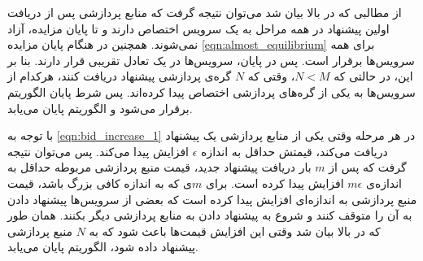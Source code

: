       از مطالبی که در بالا بیان شد می‌توان نتیجه گرفت که منابع پردازشی پس از دریافت اولین پیشنهاد در همه مراحل به یک سرویس اختصاص دارند و تا پایان مزایده، آزاد نمی‌شوند.
      همچنین در هنگام پایان مزایده \cref{eqn:almost_equilibrium} برای همه سرویس‌ها برقرار است.
      پس در پایان، سرویس‌ها در یک تعادل تقریبی قرار دارند.
      بنا بر این، در حالتی که $N<M$، وقتی که $N$ گره‌ی پردازشی پیشنهاد دریافت کنند، هرکدام از سرویس‌ها به یکی از گره‌های پردازشی اختصاص پیدا کرده‌اند.
      پس شرط پایان الگوریتم برقرار می‌شود و الگوریتم پایان می‌یابد.

      با توجه به \cref{eqn:bid_increase_1} در هر مرحله وقتی یکی از منابع پردازشی یک پیشنهاد دریافت می‌کند، قیمتش حداقل به اندازه $\epsilon$ افزایش پیدا می‌کند.
      پس می‌توان نتیجه گرفت که پس از $m$ بار دریافت پیشنهاد جدید، قیمت منبع پردازشی مربوطه حداقل به اندازه‌ی $m\epsilon$ افزایش پیدا کرده است.
      برای $m$ی که به اندازه کافی بزرگ باشد، قیمت منبع پردازشی به اندازه‌ای افزایش پیدا کرده است که بعضی از سرویس‌ها پیشنهاد دادن به آن را متوقف کنند و شروع به پیشنهاد دادن به منابع پردازشی دیگر بکنند.
      همان طور که در بالا بیان شد وقتی این افزایش قیمت‌ها باعث شود که به $N$ منبع پردازشی پیشنهاد داده شود، الگوریتم پایان می‌یابد.

